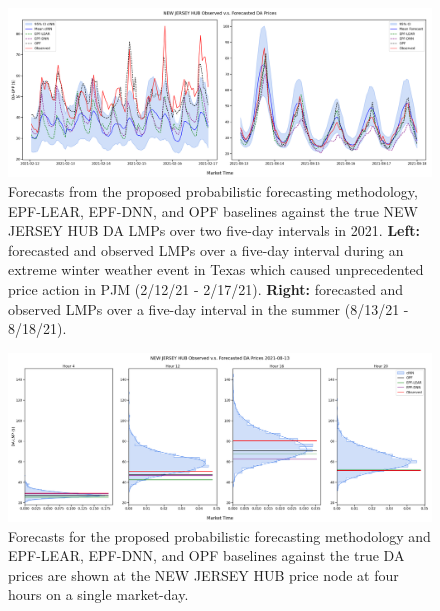 \begin{figure}[htbp]
    \caption[Timeseries of observed v.s. forecast prices over 2/12/21-2/17/21 and 8/13/21-8/18/21]{
        Forecasts from the proposed probabilistic forecasting methodology, EPF-LEAR, EPF-DNN, and OPF baselines
        against the true NEW JERSEY HUB DA LMPs over two five-day intervals in 2021.
        \textbf{Left:} forecasted and observed LMPs over a five-day interval during an extreme winter weather event in Texas which
        caused unprecedented price action in PJM (2/12/21 - 2/17/21).
        \textbf{Right:} forecasted and observed LMPs over a five-day interval in the summer (8/13/21 - 8/18/21).
    }
    \begin{center}
        \setlength{\fboxsep}{0pt}%
        \setlength{\fboxrule}{1pt}%
        \includegraphics[width=150mm]{figs/nj_hub_ts}
    \end{center}
    \label{fig:forecast_timeseries}
\end{figure}

\begin{figure}[htbp]
    \caption[Density forecasts v.s. point forecasts v.s. observed prices on 8/13/21 hours 4, 12, 16, and 20]{
        Forecasts for the proposed probabilistic forecasting methodology and EPF-LEAR, EPF-DNN, and OPF baselines
        against the true DA prices are shown at the NEW JERSEY HUB price node at four hours on a single market-day.
    }
    \begin{center}
        \setlength{\fboxsep}{0pt}%
        \setlength{\fboxrule}{1pt}%
        \includegraphics[width=150mm]{figs/nj_hub_densities}
    \end{center}
    \label{fig:univar_dens}
\end{figure}
